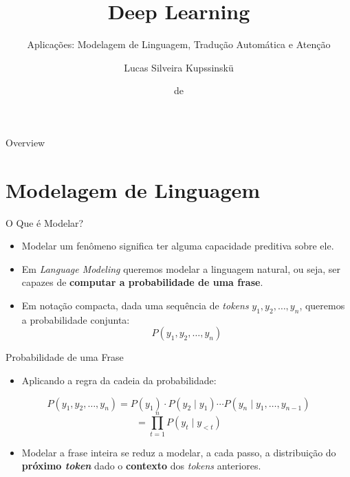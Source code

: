 \documentclass[aspectratio=169,xcolor=dvipsnames]{beamer}
\title{Deep Learning}
\subtitle{Aplicações: Modelagem de Linguagem, Tradução Automática e Atenção}
\author{Lucas Silveira Kupssinskü}
\institute
{
    Machine Learning Theory and Applications Laboratory \\
    PUCRS
}
\date{\mespor de \the\year}
\begin{document}
\begin{frame}
    \titlepage
\end{frame}

\begin{frame}{Overview}
    \tableofcontents
\end{frame}

\section{Modelagem de Linguagem}

\begin{frame}{O Que é Modelar?}
\begin{itemize}
    \item Modelar um fenômeno significa ter alguma capacidade preditiva sobre ele.
    \item Em \textit{Language Modeling} queremos modelar a linguagem natural, ou seja, ser capazes de \textbf{computar a probabilidade de uma frase}.
    \item Em notação compacta, dada uma sequência de \textit{tokens} $y_1, y_2, \dots, y_n$, queremos a probabilidade conjunta:
    \begin{equation*}
        P(y_1, y_2, \dots, y_n)
    \end{equation*}
\end{itemize}
\end{frame}

\begin{frame}{Probabilidade de uma Frase}
\begin{itemize}
    \item Aplicando a regra da cadeia da probabilidade:
\end{itemize}
\begin{equation*}
    P(y_1, y_2, \dots, y_n) = P(y_1)\cdot P(y_2 \mid y_1) \cdots P(y_n \mid y_1, \dots, y_{n-1})
\end{equation*}
\begin{equation*}
    = \prod_{t=1}^{n} P(y_t \mid y_{<t})
\end{equation*}
\begin{itemize}
    \item Modelar a frase inteira se reduz a modelar, a cada passo, a distribuição do \textbf{próximo \textit{token}} dado o \textbf{contexto} dos \textit{tokens} anteriores.
\end{itemize}
\end{frame}
\end{document}
